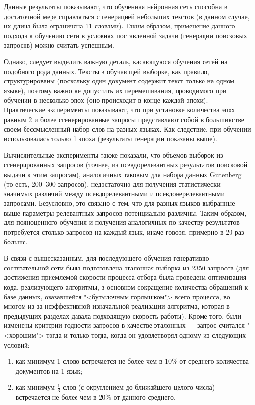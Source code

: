 Данные результаты показывают, что обученная нейронная сеть способна в достаточной мере справляться с генерацией небольших текстов (в данном случае, их длина
была ограничена 11 словами). Таким образом, применение данного подхода к обучению сети в условиях поставленной задачи (генерации поисковых запросов) можно
считать успешным.

Однако, следует выделить важную деталь, касающуюся обучения сетей на подобного рода данных. Тексты в обучающей выборке, как правило, структурированы 
(поскольку один документ содержит текст только на одном языке), поэтому важно не допустить их перемешивания, проводимого при обучении в несколько эпох
(оно происходит в конце каждой эпохи). Практические эксперименты показывают, что при установке количества эпох равным 2 и более сгенерированные запросы
представляют собой в большинстве своем бессмысленный набор слов на разных языках. Как следствие, при обучении использовалась только 1 эпоха (результаты
генерации показаны выше).

Вычислительные эксперименты также показали, что объемов выборок из сгенерированных запросов (точнее, из псевдорелевантных результатов поисковой выдачи
к этим запросам), аналогичных таковым для набора данных Gutenberg (то есть, 200--300 запросов), недостаточно для получения статистически значимых
различий между псевдорелевантными и псевдонерелевантными запросами. Безусловно, это связано с тем, что для разных языков выбранные выше параметры 
релевантных запросов потенциально различны. Таким образом, для полноценного обучения и получения аналогичных по качеству результатов потребуется
столько запросов на каждый язык, иначе говоря, примерно в 20 раз больше.

В связи с вышесказанным, для последующего обучения генеративно-состязательной сети была подготовлена эталонная выборка из 2350 запросов (для достижения
приемлемой скорости процесса отбора была проведена оптимизация кода, реализующего алгоритмы, в основном сокращение количества обращений
к базе данных, оказавшейся "<бутылочным горлышком"> всего процесса, во многом из-за неэффективной изначальной реализации алгоритма, которая в предыдущих
разделах давала подходящую скорость работы). Кроме того, были изменены критерии годности запросов в качестве эталонных --- запрос считался "<хорошим">
тогда и только тогда, когда он удовлетворял одному из следующих условий:

\begin{enumerate}[1)]
    \item как минимум 1 слово встречается не более чем в 10\% от среднего количества документов на 1 язык;
    \item как минимум \(\frac{1}{3}\) слов (с округлением до ближайшего целого числа) встречается
    не более чем в 20\% от данного среднего.
\end{enumerate}

